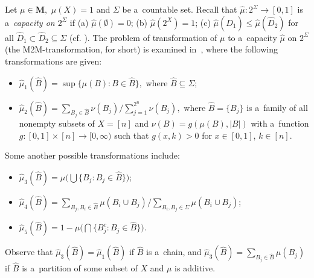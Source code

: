\documentclass[preprint,11pt]{elsarticle}
\theoremstyle{definition}
\newcommand\bM{\mathbf{M}} %
\renewcommand\le{\leqslant}
\newcommand{\tx}{\textstyle{}}
\begin{document}
Let $\mu\in\bM,$ $\mu(X)=1$ and $\Sigma$ be a~countable set.
Recall that $\widehat{\mu}\colon 2^{\Sigma}\to [0,1]$ is a~\textit{capacity on $2^{\Sigma}$}  if (a) $\widehat{\mu}(\emptyset)=0$; (b) $\widehat{\mu}(2^X)=1$; (c) $\widehat{\mu}(\widehat{D}_1)\le \widehat{\mu}(\widehat{D}_2)$ for all  $\widehat{D}_1\subset \widehat{D}_2\subseteq \Sigma$ (cf. \cite{YM}). The problem of transformation of $\mu$ to a~capacity
$\widehat{\mu}$ on $2^\Sigma$ (the M2M-transformation, for short)
is examined in~\cite[Sec.\,IV-V]{YM}, where the following transformations are given:
\begin{itemize}[noitemsep]
    \item  $\widehat{\mu}_1(\widehat{B})=\sup \{\mu(B)\colon B\in \widehat{B}\},$ where $\hat{B}\subseteq \Sigma$;

    \item ${\tx \widehat{\mu}_2(\widehat{B})=\sum _{B_j\in \widehat{B}}\nu(B_j)/\sum _{j=1}^{2^n}\nu(B_j)},$ where $\widehat{B}=\{B_j\}$ is a~family of all nonempty subsets of $X=[n]$ and $\nu(B)=g(\mu(B),|B|)$ with  a~function $g\colon [0,1]\times [n]\to [0,\infty)$  such that $g(x,k)>0$ for $x\in [0,1]$, $k\in [n]$.
\end{itemize}
Some another possible transformations include:
\begin{itemize}[noitemsep]
    \item  ${\tx \widehat{\mu}_3(\widehat{B})=\mu\big(\bigcup\{B_j\colon B_j\in \widehat{B}\}\big)};$
    \item ${\tx \widehat{\mu}_4(\widehat{B})=\sum _{B_j,B_i\in \widehat{B}}\mu(B_i\cup B_j)/\sum _{B_i,B_j\in \Sigma}\mu(B_i\cup B_j)}$;
    \item ${\tx \widehat{\mu}_5(\widehat{B})=1-\mu\big(\bigcap\{B_j^c\colon B_j\in \widehat{B}\}\big)}.$
\end{itemize}
Observe that $\widehat{\mu}_3(\widehat{B})=\widehat{\mu}_1(\widehat{B})$ if $\widehat{B}$ is a~chain, and $\widehat{\mu}_3(\widehat{B})={\tx \sum_{B_j\in \widehat{B}}\mu(B_j)}$ if $\widehat{B}$ is a~partition of some subset of $X$ and $\mu$ is additive.
\end{document}
